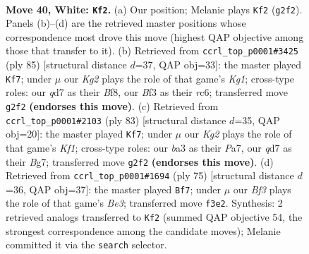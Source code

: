 \documentclass[11pt]{article}
\begin{document}
\clearpage

\begin{figure}[p]\centering
\begin{subfigure}{0.46\textwidth}\centering
\resizebox{\linewidth}{!}{%
\newchessgame
\chessboard[
  setfen={8/pp1q2kp/6p1/4R3/5PPP/b4B2/6K1/8 w - - 3 40},
  showmover=false,
  pgfstyle=straightmove, color=movearrow, markmove={g2-f2}
]}
\caption{}
\end{subfigure}\hfill
\begin{subfigure}{0.46\textwidth}\centering
\resizebox{\linewidth}{!}{%
\newchessgame
\chessboard[
  setfen={5bk1/8/2R4p/2P2pp1/1r6/7P/5BP1/5K2 b - - 0 43},
  showmover=false,
  pgfstyle=straightmove, color=movearrow, markmove={g8-f7}
]}
\caption{}
\end{subfigure}
\\[4pt]
\begin{subfigure}{0.46\textwidth}\centering
\resizebox{\linewidth}{!}{%
\newchessgame
\chessboard[
  setfen={5k2/p5bB/1p5p/3p4/3P4/1P2P3/P4K2/8 b - - 0 42},
  showmover=false,
  pgfstyle=straightmove, color=movearrow, markmove={f8-f7}
]}
\caption{}
\end{subfigure}\hfill
\begin{subfigure}{0.46\textwidth}\centering
\resizebox{\linewidth}{!}{%
\newchessgame
\chessboard[
  setfen={4r1k1/6p1/4bp1p/8/5P2/2Q4P/6PK/8 b - - 2 38},
  showmover=false,
  pgfstyle=straightmove, color=movearrow, markmove={e6-f7}
]}
\caption{}
\end{subfigure}
\caption{\textbf{Move 40, White: \texttt{Kf2}.} (a) Our position; Melanie plays \texttt{Kf2} (\texttt{g2f2}). Panels (b)--(d) are the retrieved master positions whose correspondence most drove this move (highest QAP objective among those that transfer to it). (b) Retrieved from \texttt{ccrl\_top\_p0001\#3425} (ply 85) [structural distance $d$=37, QAP obj=33]: the master played \texttt{Kf7}; under $\mu$ our \emph{Kg2} plays the role of that game's \emph{Kg1}; cross-type roles: our \emph{q}d7 as their \emph{B}f8, our \emph{B}f3 as their \emph{r}c6; transferred move \texttt{g2f2} \textbf{(endorses this move)}. (c) Retrieved from \texttt{ccrl\_top\_p0001\#2103} (ply 83) [structural distance $d$=35, QAP obj=20]: the master played \texttt{Kf7}; under $\mu$ our \emph{Kg2} plays the role of that game's \emph{Kf1}; cross-type roles: our \emph{b}a3 as their \emph{P}a7, our \emph{q}d7 as their \emph{B}g7; transferred move \texttt{g2f2} \textbf{(endorses this move)}. (d) Retrieved from \texttt{ccrl\_top\_p0001\#1694} (ply 75) [structural distance $d$=36, QAP obj=37]: the master played \texttt{Bf7}; under $\mu$ our \emph{Bf3} plays the role of that game's \emph{Be3}; transferred move \texttt{f3e2}. Synthesis: 2 retrieved analogs transferred to \texttt{Kf2} (summed QAP objective 54, the strongest correspondence among the candidate moves); Melanie committed it via the \texttt{search} selector.}
\label{fig:thought-m78}
\end{figure}
\end{document}
